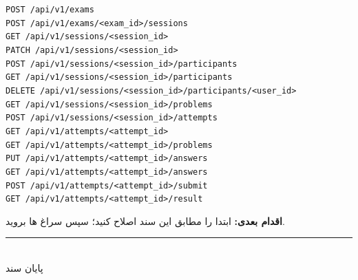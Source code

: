 \documentclass[a4paper,11pt]{article}
\newcommand{\apipath}[1]{\texttt{#1}}
\newcommand{\codeline}[1]{\apipath{#1}\\}
\begin{document}
\begin{codebox}
\codeline{POST   /api/v1/exams}
\codeline{POST   /api/v1/exams/<exam\_id>/sessions}
\codeline{GET    /api/v1/sessions/<session\_id>}
\codeline{PATCH  /api/v1/sessions/<session\_id>}
\codeline{POST   /api/v1/sessions/<session\_id>/participants}
\codeline{GET    /api/v1/sessions/<session\_id>/participants}
\codeline{DELETE /api/v1/sessions/<session\_id>/participants/<user\_id>}
\codeline{GET    /api/v1/sessions/<session\_id>/problems}
\codeline{POST   /api/v1/sessions/<session\_id>/attempts}
\codeline{GET    /api/v1/attempts/<attempt\_id>}
\codeline{GET    /api/v1/attempts/<attempt\_id>/problems}
\codeline{PUT    /api/v1/attempts/<attempt\_id>/answers}
\codeline{GET    /api/v1/attempts/<attempt\_id>/answers}
\codeline{POST   /api/v1/attempts/<attempt\_id>/submit}
\apipath{GET    /api/v1/attempts/<attempt\_id>/result}
\end{codebox}

\noindent
\textbf{اقدام بعدی:} ابتدا  را مطابق این سند اصلاح کنید؛ سپس سراغ ها بروید.

\vspace{1.5em}
\begin{center}
\rule{0.4\textwidth}{0.4pt}\\[0.6em]
{\small پایان سند}
\end{center}
\end{document}
